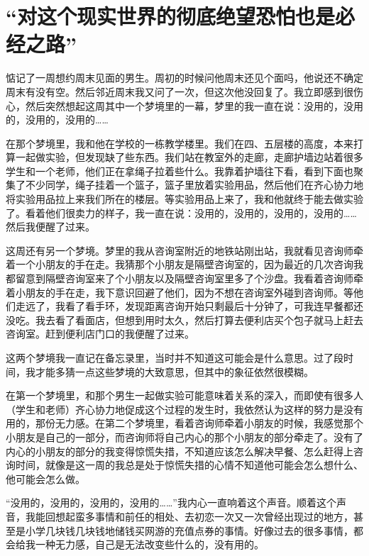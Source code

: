 \chapter{“对这个现实世界的彻底绝望恐怕也是必经之路”}




惦记了一周想约周末见面的男生。周初的时候问他周末还见个面吗，他说还不确定周末有没有空。然后邻近周末我又问了一次，但这次他没回复了。我立即感到很伤心，然后突然想起这周其中一个梦境里的一幕，梦里的我一直在说：没用的，没用的，没用的，没用的……

在那个梦境里，我和他在学校的一栋教学楼里。我们在四、五层楼的高度，本来打算一起做实验，但发现缺了些东西。我们站在教室外的走廊，走廊护墙边站着很多学生和一个老师，他们正在拿绳子拉着些什么。我靠着护墙往下看，看到下面也聚集了不少同学，绳子挂着一个篮子，篮子里放着实验用品，然后他们在齐心协力地将实验用品拉上来我们所在的楼层。等实验用品上来了，我和他就终于能去做实验了。看着他们很卖力的样子，我一直在说：没用的，没用的，没用的，没用的……然后我便醒了过来。

这周还有另一个梦境。梦里的我从咨询室附近的地铁站刚出站，我就看见咨询师牵着一个小朋友的手在走。我猜那个小朋友是隔壁咨询室的，因为最近的几次咨询我都留意到隔壁咨询室来了个小朋友以及隔壁咨询室里多了个沙盘。我看着咨询师牵着小朋友的手在走，我下意识回避了他们，因为不想在咨询室外碰到咨询师。等他们走远了，我看了看手环，发现距离咨询开始只剩最后十分钟了，可我连早餐都还没吃。我去看了看面店，但想到用时太久，然后打算去便利店买个包子就马上赶去咨询室。赶到便利店门口的我便醒了过来。

这两个梦境我一直记在备忘录里，当时并不知道这可能会是什么意思。过了段时间，我才能多猜一点这些梦境的大致意思，但其中的象征依然很模糊。

在第一个梦境里，和那个男生一起做实验可能意味着关系的深入，而即使有很多人（学生和老师）齐心协力地促成这个过程的发生时，我依然认为这样的努力是没有用的，那份无力感。在第二个梦境里，看着咨询师牵着小朋友的时候，我感觉那个小朋友是自己的一部分，而咨询师将自己内心的那个小朋友的部分牵走了。没有了内心的小朋友的部分的我变得惊慌失措，不知道应该怎么解决早餐、怎么赶得上咨询时间，就像是这一周的我总是处于惊慌失措的心情\pozhehao{}不知道他可能会怎么想什么、他可能会怎么做。

“没用的，没用的，没用的，没用的……”我内心一直响着这个声音。顺着这个声音，我能回想起蛮多事情\pozhehao{}和前任的相处、去初恋一次又一次曾经出现过的地方，甚至是小学几块钱几块钱地储钱买网游的充值点券的事情。好像过去的很多事情，都会给我一种无力感，自己是无法改变些什么的，没有用的。

